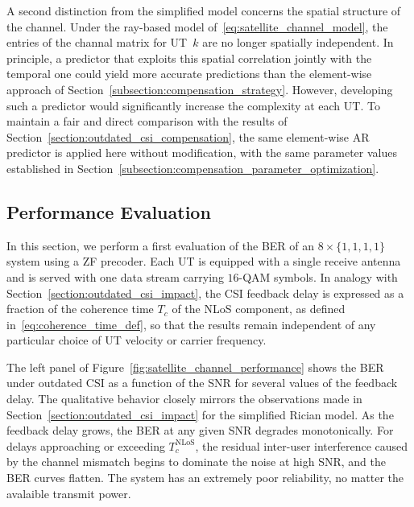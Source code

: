 A second distinction from the simplified model concerns the spatial structure of the channel.
Under the ray-based model of~\eqref{eq:satellite_channel_model}, the entries of the channal matrix for \ac{UT}~$k$ are no longer spatially independent.
In principle, a predictor that exploits this spatial correlation jointly with the temporal one could yield more accurate predictions than the element-wise approach of Section~\ref{subsection:compensation_strategy}.
However, developing such a predictor would significantly increase the complexity at each \ac{UT}.
To maintain a fair and direct comparison with the results of Section~\ref{section:outdated_csi_compensation}, the same element-wise \ac{AR} predictor is applied here without modification, with the same parameter values established in Section~\ref{subsection:compensation_parameter_optimization}.

\subsection{Performance Evaluation}
\label{subsection:performance_evaluation}

In this section, we perform a first evaluation of the \ac{BER} of an $8 \times \{1,1,1,1\}$ system using a \ac{ZF} precoder. Each \ac{UT} is equipped with a single receive antenna and is served with one data stream carrying $16$-\ac{QAM} symbols.
In analogy with Section~\ref{section:outdated_csi_impact}, the \ac{CSI} feedback delay is expressed as a fraction of the coherence time $T_c$ of the \ac{NLoS} component, as defined in~\eqref{eq:coherence_time_def}, so that the results remain independent of any particular choice of \ac{UT} velocity or carrier frequency.

The left panel of Figure~\ref{fig:satellite_channel_performance} shows the \ac{BER} under outdated \ac{CSI} as a function of the \ac{SNR} for several values of the feedback delay.
The qualitative behavior closely mirrors the observations made in Section~\ref{section:outdated_csi_impact} for the simplified Rician model.
As the feedback delay grows, the \ac{BER} at any given \ac{SNR} degrades monotonically.
For delays approaching or exceeding $T_c^{\mathrm{NLoS}}$, the residual inter-user interference caused by the channel mismatch begins to dominate the noise at high \ac{SNR}, and the \ac{BER} curves flatten. The system has an extremely poor reliability, no matter the avalaible transmit power.


